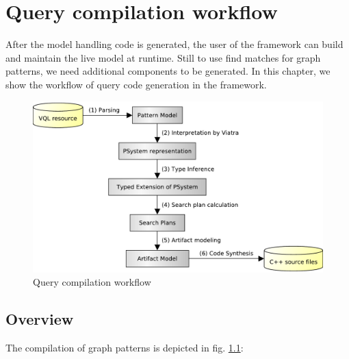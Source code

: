 

\chapter{Query compilation workflow}

After the model handling code is generated, the user of the framework can build and maintain the live model at runtime. 
Still to use find matches for graph patterns, we need additional components to be generated. 
In this chapter, we show the workflow of query code generation in the framework. 


\begin{figure}[H]
	\begin{center}
		\includegraphics[width=\textwidth]{figures/query-compilation-workflow.pdf}
		\caption{Query compilation workflow}
		\label{figure:query-compile-workflow}
	\end{center}
\end{figure}


\section{Overview}

The compilation of graph patterns is depicted in fig. \ref{figure:query-compile-workflow}:

